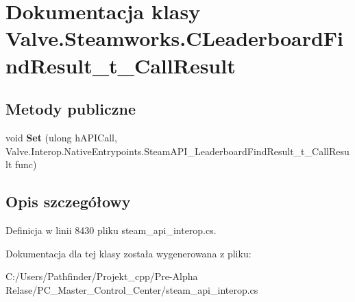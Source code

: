 \hypertarget{class_valve_1_1_steamworks_1_1_c_leaderboard_find_result__t___call_result}{}\section{Dokumentacja klasy Valve.\+Steamworks.\+C\+Leaderboard\+Find\+Result\+\_\+t\+\_\+\+Call\+Result}
\label{class_valve_1_1_steamworks_1_1_c_leaderboard_find_result__t___call_result}
\subsection*{Metody publiczne}
\begin{DoxyCompactItemize}
\item 
\mbox{\label{class_valve_1_1_steamworks_1_1_c_leaderboard_find_result__t___call_result_aee4278a9ed828dc9ec9e93a80599a618}} 
void {\bfseries Set} (ulong h\+A\+P\+I\+Call, Valve.\+Interop.\+Native\+Entrypoints.\+Steam\+A\+P\+I\+\_\+\+Leaderboard\+Find\+Result\+\_\+t\+\_\+\+Call\+Result func)
\end{DoxyCompactItemize}


\subsection{Opis szczegółowy}


Definicja w linii 8430 pliku steam\+\_\+api\+\_\+interop.\+cs.



Dokumentacja dla tej klasy została wygenerowana z pliku\+:\begin{DoxyCompactItemize}
\item 
C\+:/\+Users/\+Pathfinder/\+Projekt\+\_\+cpp/\+Pre-\/\+Alpha Relase/\+P\+C\+\_\+\+Master\+\_\+\+Control\+\_\+\+Center/steam\+\_\+api\+\_\+interop.\+cs\end{DoxyCompactItemize}

